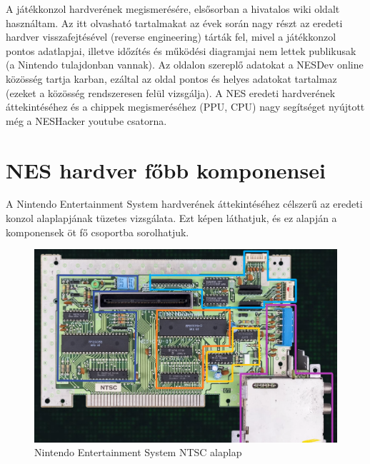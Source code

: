A játékkonzol hardverének megismerésére, elsősorban a hivatalos wiki oldalt használtam. Az itt olvasható tartalmakat az évek során nagy részt az eredeti hardver visszafejtésével (reverse engineering) tárták fel, mivel a játékkonzol pontos adatlapjai, illetve időzítés és működési diagramjai nem lettek publikusak (a Nintendo tulajdonban vannak). Az oldalon szereplő adatokat a NESDev online közösség tartja karban, ezáltal az oldal pontos és helyes adatokat tartalmaz (ezeket a közösség rendszeresen felül vizsgálja). A NES eredeti hardverének áttekintéséhez és a chippek megismeréséhez (PPU, CPU) nagy segítséget nyújtott még a NESHacker youtube csatorna. 

\section{NES hardver főbb komponensei}

A Nintendo Entertainment System hardverének áttekintéséhez célszerű az eredeti konzol alaplapjának tüzetes vizsgálata. Ezt  képen láthatjuk, és ez alapján a komponensek öt fő csoportba sorolhatjuk.

\begin{figure}[H]
	\centering
	\includegraphics[width=150mm, keepaspectratio]{figures/NES-motherboard-lines}
	\caption{Nintendo Entertainment System NTSC alaplap \cite{NES_hardware}}
	\label{fig:NES-Motherboard}
\end{figure}

